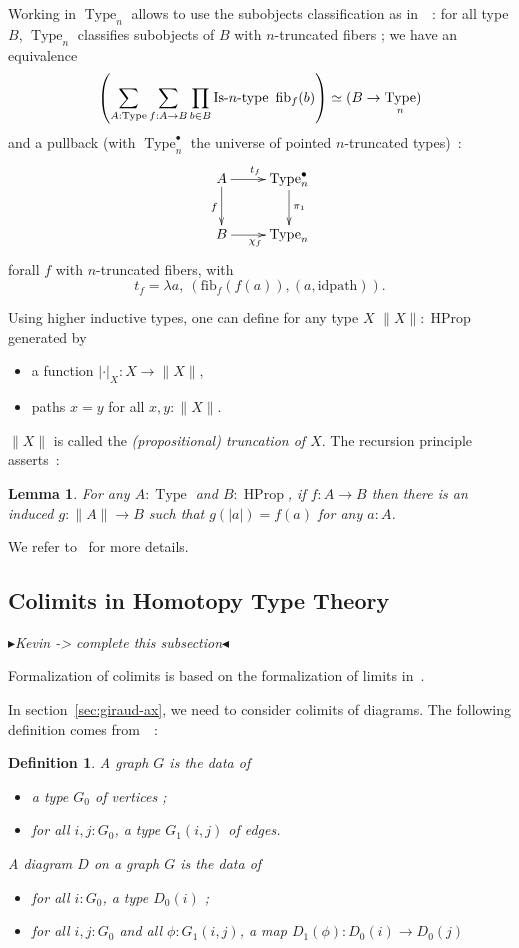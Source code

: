 \documentclass[conference]{IEEEtran}
\newtheorem{defi}[thm]{Definition}
\newtheorem{lem}[thm]{Lemma}
\newcommand{\mynote}[2]{
    \fbox{\bfseries\sffamily\scriptsize#1}
    {\small$\blacktriangleright$\textsf{\emph{#2}}$\blacktriangleleft$}~}
\newcommand\nt[1]{\mynote{NT}{#1}}
\DeclareMathOperator{\Type}{Type}
\DeclareMathOperator{\HProp}{HProp}
\def\mymathhyphen{{\hbox{-}}}
\newcommand{\IsType}[1]{\mathop{\mathrm{Is\mymathhyphen}#1\mathrm{\mymathhyphen
      type}} }
\begin{document}
Working in $\Type_n$ allows to use the subobjects classification as in~\cite{sets_in_hott}~: for
all type $B$, $\Type_n$ classifies subobjects of $B$ with $n$-truncated
fibers ; we have an equivalence
$$\left(\sum_{A:\Type} \sum_{f:A \to B} \prod_{b\in B}
\IsType n~\mathrm{fib}_f(b)\right) \simeq (B \to \Type_n)$$
and a pullback (with $\Type_n^\bullet$ the universe of pointed
$n$-truncated types)~:
$$
\xymatrix{
  A \ar[r]^{t_f} \ar[d]_f & \Type_n^\bullet \ar[d]^{\pi_1}\\
  B \ar[r]_{\chi_f} & \Type_n
}
$$
forall $f$ with $n$-truncated fibers, with 
$$t_f = \lambda a,~(\mathrm{fib}_f(f(a)),(a,\mathrm{idpath})).$$

Using higher inductive types, one can define for any type $X$ $\|X\| : \HProp$
generated by 
\begin{itemize}
\item a function $|\cdot|_X : X \to \|X\|$,
\item paths $x=y$ for all $x,y:\|X\|$.
\end{itemize}
$\|X\|$ is called the {\em (propositional) truncation of $X$}. The recursion principle asserts~:
\begin{lem}
  For any $A:\Type$ and $B:\HProp$, if $f:A \to B$ then there is an
  induced $g:\|A\|\to B$ such that $g(|a|)= f(a)$ for any $a:A$.
\end{lem}
We refer to~\cite{hottbook} for more details.

\subsection{Colimits in Homotopy Type Theory }
\label{sec:colim-homot-type}

\nt{Kevin -> complete this subsection}

Formalization of colimits is based on the formalization of limits in~\cite{lumsdaine}.

In section~\ref{sec:giraud-ax}, we need to consider colimits of
diagrams.
The following definition comes from~\cite{lumsdaine}~:
\begin{defi}
  A {\em graph} $G$ is the data of
  \begin{itemize}
  \item a type $G_0$ of vertices ;
  \item for all $i,j:G_0$, a type $G_1(i,j)$ of edges.
  \end{itemize}

  A {\em diagram} $D$ on a graph $G$ is the data of
  \begin{itemize}
  \item for all $i:G_0$, a type $D_0(i)$ ;
  \item for all $i,j:G_0$ and all $\phi : G_1(i,j)$, a map $D_1(\phi)
    : D_0(i) \to D_0(j)$
  \end{itemize}
\end{defi}
\end{document}
